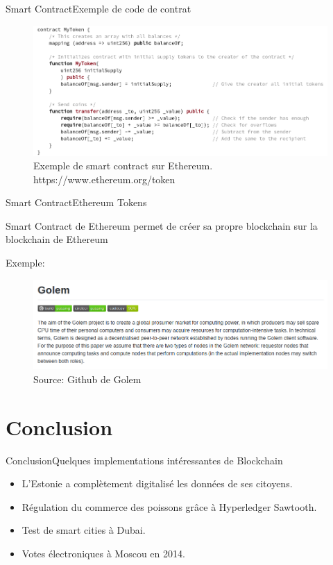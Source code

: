 \documentclass[xcolor=dvipsnames]{beamer}
\begin{document}
\begin{frame}{Smart Contract}{Exemple de code de contrat}

	\begin{figure}
		\centering
		\includegraphics[scale=.35]{contract_example}
		\caption{Exemple de smart contract sur Ethereum. https://www.ethereum.org/token}
	\end{figure}

\end{frame}

\begin{frame}{Smart Contract}{Ethereum Tokens}

	\begin{center}
		\color{blue}
		Smart Contract de Ethereum permet de créer sa propre blockchain sur la blockchain de Ethereum
	\end{center}
	
	Exemple:
	\begin{figure}
	\includegraphics[scale=.35]{golem}
	\caption{Source: Github de Golem}
	\end{figure}

\end{frame}

\section{Conclusion}

\begin{frame}{Conclusion}{Quelques implementations intéressantes de Blockchain}

	\begin{itemize}
		\item L'Estonie a complètement digitalisé les données de ses citoyens.
		\item Régulation du commerce des poissons grâce à Hyperledger Sawtooth.
		\item Test de smart cities à Dubai.
		\item Votes électroniques à Moscou en 2014.
	\end{itemize}
	
\end{frame}
\end{document}
